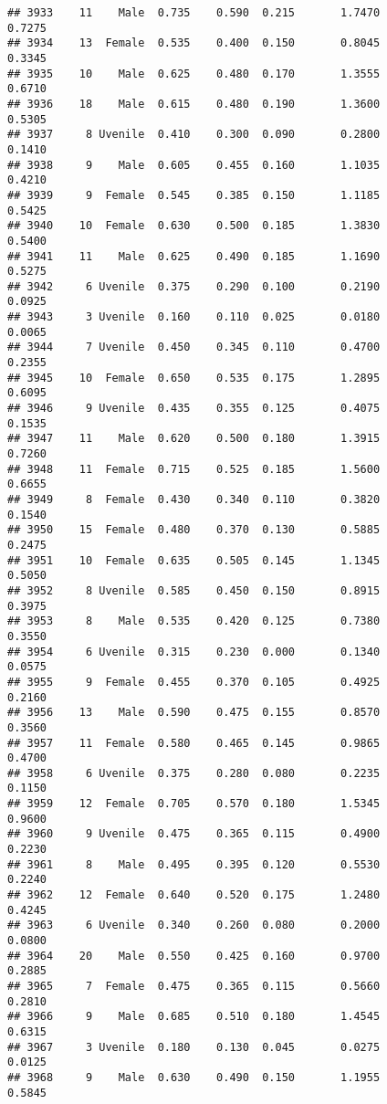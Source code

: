 \documentclass[
]{article}
\begin{document}
\begin{verbatim}
## 3933    11    Male  0.735    0.590  0.215       1.7470         0.7275
## 3934    13  Female  0.535    0.400  0.150       0.8045         0.3345
## 3935    10    Male  0.625    0.480  0.170       1.3555         0.6710
## 3936    18    Male  0.615    0.480  0.190       1.3600         0.5305
## 3937     8 Uvenile  0.410    0.300  0.090       0.2800         0.1410
## 3938     9    Male  0.605    0.455  0.160       1.1035         0.4210
## 3939     9  Female  0.545    0.385  0.150       1.1185         0.5425
## 3940    10  Female  0.630    0.500  0.185       1.3830         0.5400
## 3941    11    Male  0.625    0.490  0.185       1.1690         0.5275
## 3942     6 Uvenile  0.375    0.290  0.100       0.2190         0.0925
## 3943     3 Uvenile  0.160    0.110  0.025       0.0180         0.0065
## 3944     7 Uvenile  0.450    0.345  0.110       0.4700         0.2355
## 3945    10  Female  0.650    0.535  0.175       1.2895         0.6095
## 3946     9 Uvenile  0.435    0.355  0.125       0.4075         0.1535
## 3947    11    Male  0.620    0.500  0.180       1.3915         0.7260
## 3948    11  Female  0.715    0.525  0.185       1.5600         0.6655
## 3949     8  Female  0.430    0.340  0.110       0.3820         0.1540
## 3950    15  Female  0.480    0.370  0.130       0.5885         0.2475
## 3951    10  Female  0.635    0.505  0.145       1.1345         0.5050
## 3952     8 Uvenile  0.585    0.450  0.150       0.8915         0.3975
## 3953     8    Male  0.535    0.420  0.125       0.7380         0.3550
## 3954     6 Uvenile  0.315    0.230  0.000       0.1340         0.0575
## 3955     9  Female  0.455    0.370  0.105       0.4925         0.2160
## 3956    13    Male  0.590    0.475  0.155       0.8570         0.3560
## 3957    11  Female  0.580    0.465  0.145       0.9865         0.4700
## 3958     6 Uvenile  0.375    0.280  0.080       0.2235         0.1150
## 3959    12  Female  0.705    0.570  0.180       1.5345         0.9600
## 3960     9 Uvenile  0.475    0.365  0.115       0.4900         0.2230
## 3961     8    Male  0.495    0.395  0.120       0.5530         0.2240
## 3962    12  Female  0.640    0.520  0.175       1.2480         0.4245
## 3963     6 Uvenile  0.340    0.260  0.080       0.2000         0.0800
## 3964    20    Male  0.550    0.425  0.160       0.9700         0.2885
## 3965     7  Female  0.475    0.365  0.115       0.5660         0.2810
## 3966     9    Male  0.685    0.510  0.180       1.4545         0.6315
## 3967     3 Uvenile  0.180    0.130  0.045       0.0275         0.0125
## 3968     9    Male  0.630    0.490  0.150       1.1955         0.5845

\end{verbatim}
\end{document}
